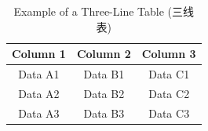 \documentclass{article}
\begin{document}
\begin{table}[h]
\centering
\caption{Example of a Three-Line Table (三线表)}
\label{tab:example}
\begin{tabular}{ccc}
\toprule
Column 1 & Column 2 & Column 3 \\
\midrule
Data A1 & Data B1 & Data C1 \\
Data A2 & Data B2 & Data C2 \\
Data A3 & Data B3 & Data C3 \\
\bottomrule
\end{tabular}
\end{table}
\end{document}
